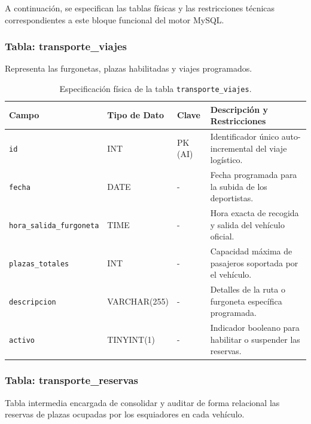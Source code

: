         A continuación, se especifican las tablas físicas y las restricciones técnicas correspondientes a este bloque funcional del motor MySQL.
        \newpage
        \subsubsection{Tabla: transporte\_viajes}
        Representa las furgonetas, plazas habilitadas y viajes programados.

        \begin{table}[htbp]
        \centering
        \scriptsize
        \renewcommand{\arraystretch}{0.9}
        \setlength{\tabcolsep}{4pt}
        \begin{tabularx}{\textwidth}{|l|l|l|X|}
        \hline
        \rowcolor[HTML]{EFEFEF} 
        \textbf{Campo} & \textbf{Tipo de Dato} & \textbf{Clave} & \textbf{Descripción y Restricciones} \\ \hline
        \texttt{id} & INT & PK (AI) & Identificador único auto-incremental del viaje logístico. \\ \hline
        \texttt{fecha} & DATE & - & Fecha programada para la subida de los deportistas. \\ \hline
        \texttt{hora\_salida\_furgoneta} & TIME & - & Hora exacta de recogida y salida del vehículo oficial. \\ \hline
        \texttt{plazas\_totales} & INT & - & Capacidad máxima de pasajeros soportada por el vehículo. \\ \hline
        \texttt{descripcion} & VARCHAR(255) & - & Detalles de la ruta o furgoneta específica programada. \\ \hline
        \texttt{activo} & TINYINT(1) & - & Indicador booleano para habilitar o suspender las reservas. \\ \hline
        \end{tabularx}
        \caption{Especificación física de la tabla \texttt{transporte\_viajes}.}
        \label{tab:dic_transporte_viajes}
        \end{table}

        \subsubsection{Tabla: transporte\_reservas}
        Tabla intermedia encargada de consolidar y auditar de forma relacional las reservas de plazas ocupadas por los esquiadores en cada vehículo.

